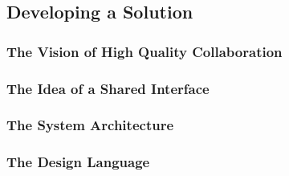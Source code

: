 \newpage
\subsection{Developing a Solution}

\subsubsection{The Vision of High Quality Collaboration}

\subsubsection{The Idea of a Shared Interface}

\subsubsection{The System Architecture}

\subsubsection{The Design Language}